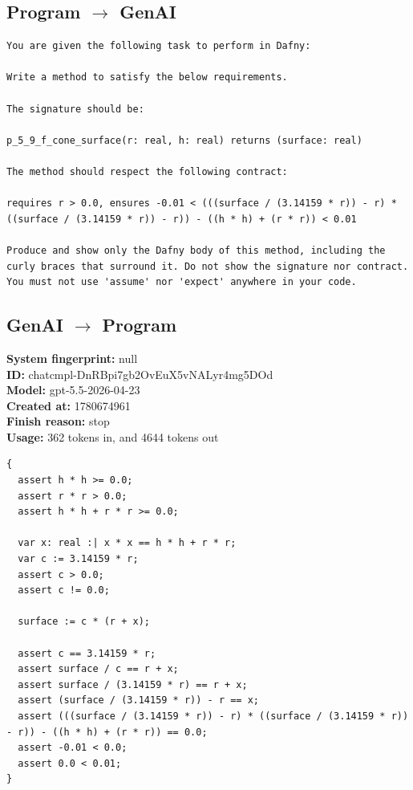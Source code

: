 \documentclass{article}
\begin{document}
\subsection*{Program $\rightarrow$ GenAI}
\begin{lstlisting}
You are given the following task to perform in Dafny:

Write a method to satisfy the below requirements.

The signature should be:

p_5_9_f_cone_surface(r: real, h: real) returns (surface: real)

The method should respect the following contract:

requires r > 0.0, ensures -0.01 < (((surface / (3.14159 * r)) - r) * ((surface / (3.14159 * r)) - r)) - ((h * h) + (r * r)) < 0.01

Produce and show only the Dafny body of this method, including the curly braces that surround it. Do not show the signature nor contract. You must not use 'assume' nor 'expect' anywhere in your code.
\end{lstlisting}
\subsection*{GenAI $\rightarrow$ Program}
\textbf{System fingerprint: }null
\\\textbf{ID: }chatcmpl-DnRBpi7gb2OvEuX5vNALyr4mg5DOd
\\\textbf{Model: }gpt-5.5-2026-04-23
\\\textbf{Created at: }1780674961
\\\textbf{Finish reason: }stop
\\\textbf{Usage: }362 tokens in, and 4644 tokens out
\begin{lstlisting}
{
  assert h * h >= 0.0;
  assert r * r > 0.0;
  assert h * h + r * r >= 0.0;

  var x: real :| x * x == h * h + r * r;
  var c := 3.14159 * r;
  assert c > 0.0;
  assert c != 0.0;

  surface := c * (r + x);

  assert c == 3.14159 * r;
  assert surface / c == r + x;
  assert surface / (3.14159 * r) == r + x;
  assert (surface / (3.14159 * r)) - r == x;
  assert (((surface / (3.14159 * r)) - r) * ((surface / (3.14159 * r)) - r)) - ((h * h) + (r * r)) == 0.0;
  assert -0.01 < 0.0;
  assert 0.0 < 0.01;
}
\end{lstlisting}
\end{document}
